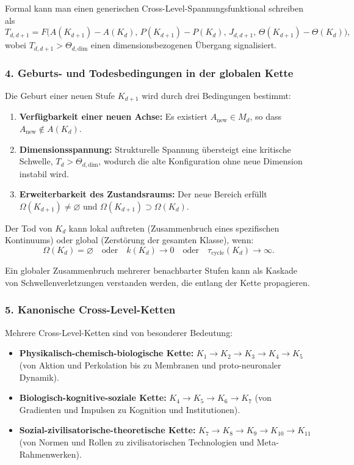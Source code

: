 Formal kann man einen generischen Cross-Level-Spannungsfunktional schreiben als
\[
T_{d,d+1} = F\bigl(
  A(K_{d+1}) - A(K_d),\,
  P(K_{d+1}) - P(K_d),\,
  J_{d,d+1},\,
  \Theta(K_{d+1}) - \Theta(K_d)
\bigr),
\]
wobei $T_{d,d+1} > \Theta_{d,\text{dim}}$ einen dimensionsbezogenen
Übergang signalisiert.

\subsubsection{4. Geburts- und Todesbedingungen in der globalen Kette}

Die Geburt einer neuen Stufe $K_{d+1}$ wird durch drei Bedingungen bestimmt:
\begin{enumerate}
  \item \textbf{Verfügbarkeit einer neuen Achse:}
        Es existiert $A_{\text{new}} \in M_d$, so dass
        $A_{\text{new}} \notin A(K_d)$.
  \item \textbf{Dimensionsspannung:}
        Strukturelle Spannung übersteigt eine kritische Schwelle,
        $T_d > \Theta_{d,\text{dim}}$, wodurch die alte Konfiguration ohne
        neue Dimension instabil wird.
  \item \textbf{Erweiterbarkeit des Zustandsraums:}
        Der neue Bereich erfüllt $\Omega(K_{d+1}) \neq \varnothing$ und
        $\Omega(K_{d+1}) \supset \Omega(K_d)$.
\end{enumerate}

Der Tod von $K_d$ kann lokal auftreten (Zusammenbruch eines spezifischen
Kontinuums) oder global (Zerstörung der gesamten Klasse), wenn:
\[
\Omega(K_d) = \varnothing
\quad\text{oder}\quad
k(K_d) \rightarrow 0
\quad\text{oder}\quad
\tau_{\text{cycle}}(K_d) \rightarrow \infty.
\]

Ein globaler Zusammenbruch mehrerer benachbarter Stufen kann als Kaskade von
Schwellenverletzungen verstanden werden, die entlang der Kette propagieren.

\subsubsection{5. Kanonische Cross-Level-Ketten}

Mehrere Cross-Level-Ketten sind von besonderer Bedeutung:
\begin{itemize}
  \item \textbf{Physikalisch-chemisch-biologische Kette:}
        $K_1 \rightarrow K_2 \rightarrow K_3 \rightarrow K_4 \rightarrow K_5$
        (von Aktion und Perkolation bis zu Membranen und proto-neuronaler Dynamik).
  \item \textbf{Biologisch-kognitive-soziale Kette:}
        $K_4 \rightarrow K_5 \rightarrow K_6 \rightarrow K_7$
        (von Gradienten und Impulsen zu Kognition und Institutionen).
  \item \textbf{Sozial-zivilisatorische-theoretische Kette:}
        $K_7 \rightarrow K_8 \rightarrow K_9 \rightarrow K_{10} \rightarrow K_{11}$
        (von Normen und Rollen zu zivilisatorischen Technologien und
        Meta-Rahmenwerken).
\end{itemize}

